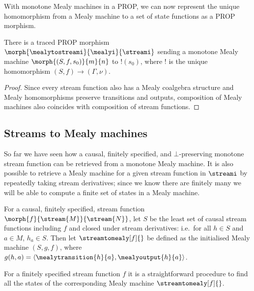 \documentclass{lmcs}
\begin{document}
With monotone Mealy machines in a PROP, we can now represent the unique
homomorphism from a Mealy machine to a set of state functions as a PROP
morphism.

\begin{prop}\label{prop:mealy-to-stream}
    There is a traced PROP morphism
    \(\morph{\mealytostreami}{\mealyi}{\streami}\) sending a monotone Mealy
    machine \(\morph{\left(S, f, s_0\right)}{m}{n}\) to \(!(s_0)\), where \(!\)
    is the unique homomorphism \((S,f) \to (\Gamma,\nu)\).
\end{prop}
\begin{proof}
    Since every stream function also has a Mealy coalgebra structure and Mealy
    homomorphisms preserve transitions and outputs,
    composition of Mealy machines also coincides with composition of stream
    functions.
\end{proof}

\subsection{Streams to Mealy machines}

So far we have seen how a causal, finitely specified, and \(\bot\)-preserving
monotone stream function can be retrieved from a monotone Mealy machine.
It is also possible to retrieve a Mealy machine for a given stream function in
\(\streami\) by repeatedly taking stream derivatives; since we know there are
finitely many we will be able to compute a finite set of states in a Mealy
machine.

\begin{defi}
    For a causal, finitely specified, stream function \(
    \morph{f}{\stream{M}}{\stream{N}}
    \), let \(S\) be the least set of
    causal stream functions including \(f\) and closed under stream derivatives:
    i.e.\ for all \(h \in S\) and \(a \in M\), \(h_a \in S\).
    Then let \(
    \streamtomealy[f]{}
    \) be defined as the initialised Mealy machine \((S, g, f)\), where \(
    g(h, a) = \langle\mealytransition{h}{a}, \mealyoutput{h}{a}\rangle
    \).
\end{defi}

For a finitely specified stream function \(f\) it is a straightforward procedure
to find all the states of the corresponding Mealy machine
\(\streamtomealy[f]{}\).
\end{document}
